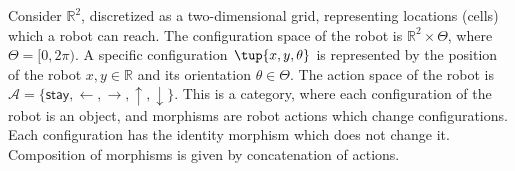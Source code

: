 \begin{example}
Consider $\mathbb{R}^2$, discretized as a two-dimensional grid, representing locations (cells) which a robot can reach. The configuration space of the robot is $\mathbb{R}^2\times \Theta$, where $\Theta=[0,2\pi)$. A specific configuration $\tup{x,y,\theta}$ is represented by the position of the robot $x,y\in \mathbb{R}$ and its orientation $\theta \in \Theta$. The action space of the robot is $\mathcal{A}=\{\mathsf{stay},\leftarrow, \rightarrow, \uparrow, \downarrow\}$. This is a category, where each configuration of the robot is an object, and morphisms are robot actions which change configurations. Each configuration has the identity morphism which does not change it. Composition of morphisms is given by concatenation of actions.
\begin{center}
\end{center}
\end{example}
